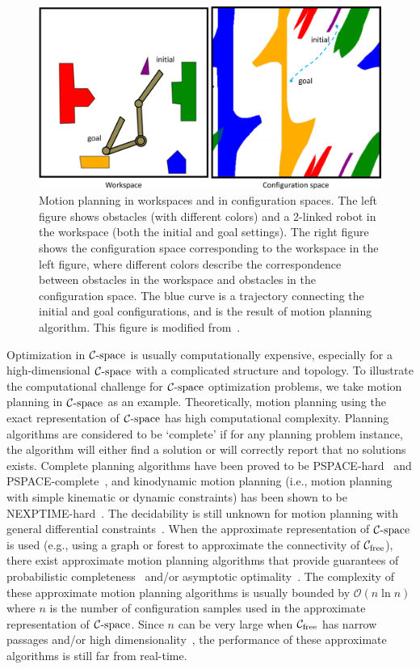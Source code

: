 \begin{figure}[htb]
  \centering
  \includegraphics[width=\linewidth]{figs/1/planning-crop.pdf}
  \caption[Motion planning in workspaces and in configuration spaces]{Motion planning in workspaces and in configuration spaces. The left figure shows obstacles (with different colors) and a 2-linked robot in the workspace (both the initial and goal settings). The right figure shows the configuration space corresponding to the workspace in the left figure, where different colors describe the correspondence between obstacles in the workspace and obstacles in the configuration space. The blue curve is a trajectory connecting the initial and goal configurations, and is the result of motion planning algorithm. This figure is modified from~\cite{cspaceJapplet}. \label{fig:1:planning}}
\end{figure}


Optimization in $\mathcal C\text{-space}$ is usually computationally expensive, especially for a high-dimensional $\mathcal C\text{-space}$ with a complicated structure and topology. To illustrate the computational challenge for $\mathcal C\text{-space}$ optimization problems, we take motion planning in $\mathcal C\text{-space}$ as an example. Theoretically, motion planning using the exact representation of $\mathcal C\text{-space}$ has high computational complexity. Planning algorithms are considered to be `complete' if for any planning problem instance, the algorithm will either find a solution or will correctly report that no solutions exists. Complete planning algorithms have been proved to be PSPACE-hard~\cite{Reif:1979:CMP} and PSPACE-complete~\cite{Canny:1988:AGC}, and kinodynamic motion planning (i.e., motion planning with simple kinematic or dynamic constraints) has been shown to be NEXPTIME-hard~\cite{Canny:1988:CKP}. 
The decidability is still unknown for motion planning with general differential constraints~\cite{Cheng:2007:DMP}. When the approximate representation of $\mathcal C\text{-space}$ is used (e.g., using a graph or forest to approximate the connectivity of $\mathcal C_{\text{free}}$), there exist approximate motion planning algorithms that provide guarantees of probabilistic completeness~\cite{Kavraki96,Kuffner00} and/or asymptotic optimality~\cite{Sertac:IJRR:2011}. The complexity of these approximate motion planning algorithms is usually bounded by $\mathcal O(n\ln n)$ where $n$ is the number of configuration samples used in the approximate representation of $\mathcal C\text{-space}$. Since $n$ can be very large when $\mathcal C_{\text{free}}$ has narrow passages and/or high dimensionality~\cite{Hsu:2006:ijrr}, the performance of these approximate algorithms is still far from real-time.

